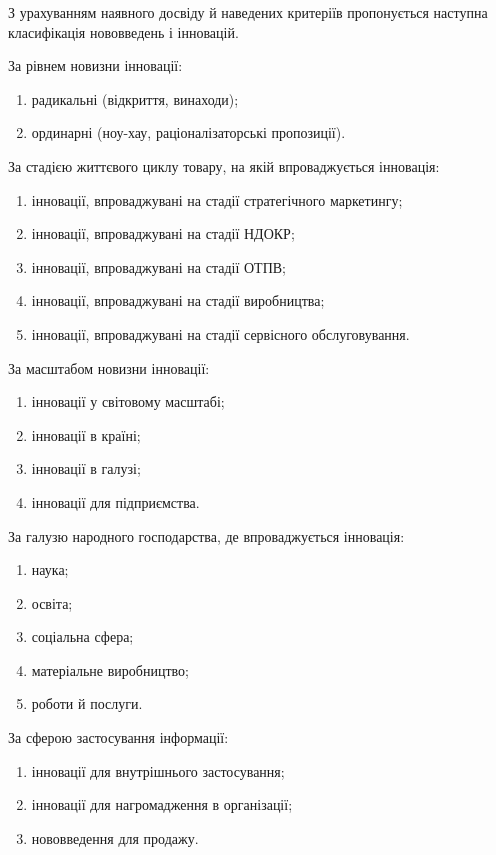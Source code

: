 З урахуванням наявного досвіду й наведених критеріїв пропонується наступна класифікація нововведень і інновацій.

За рівнем новизни інновації:

\begin{enumerate}
	\item радикальні (відкриття, винаходи);
	\item ординарні (ноу-хау, раціоналізаторські пропозиції).
\end{enumerate}

За стадією життєвого циклу товару, на якій впроваджується інновація:

\begin{enumerate}
	\item інновації, впроваджувані на стадії стратегічного маркетингу;
	\item інновації, впроваджувані на стадії НДОКР;
	\item інновації, впроваджувані на стадії ОТПВ;
	\item інновації, впроваджувані на стадії виробництва;
	\item інновації, впроваджувані на стадії сервісного обслуговування.
\end{enumerate}

За масштабом новизни інновації:

\begin{enumerate}
	\item інновації у світовому масштабі;
	\item інновації в країні;
	\item інновації в галузі;
	\item інновації для підприємства.
\end{enumerate}

За галузю народного господарства, де впроваджується інновація:

\begin{enumerate}
	\item наука;
	\item освіта;
	\item соціальна сфера;
	\item матеріальне виробництво;
	\item роботи й послуги.
\end{enumerate}

За сферою застосування інформації:

\begin{enumerate}
	\item інновації для внутрішнього застосування;
	\item інновації для нагромадження в організації;
	\item нововведення для продажу.
\end{enumerate}

